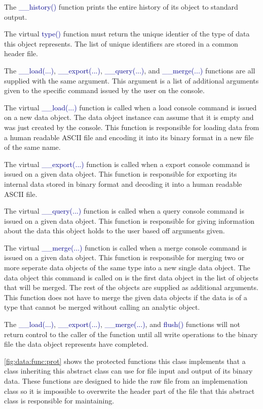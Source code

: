 \documentclass[10pt]{article}
\providecommand{\h}[1]{\textcolor{darkblue}{#1}}
\begin{document}
The \h{\_\_history()} function prints the entire history of its object to 
standard output.

The virtual \h{type()} function must return the unique identier of the type of 
data this object represents. The list of unique identifiers are stored in a 
common header file.

The \h{\_\_load(...)}, \h{\_\_export(...)}, \h{\_\_query(...)}, and 
\h{\_\_merge(...)} functions are all supplied with the same argument. This 
argument is a list of additional arguments given to the specific command issued 
by the user on the console.

The virtual \h{\_\_load(...)} function is called when a load console command 
is issued on a new data object. The data object instance can assume that it is 
empty and was just created by the console. This function is responsible for 
loading data from a human readable ASCII file and encoding it into its binary 
format in a new file of the same name.

The virtual \h{\_\_export(...)} function is called when a export console command 
is issued on a given data object. This function is responsible for exporting 
its internal data stored in binary format and decoding it into a human readable 
ASCII file.

The virtual \h{\_\_query(...)} function is called when a query console command 
is issued on a given data object. This function is responsible for giving 
information about the data this object holds to the user based off arguments 
given.

The virtual \h{\_\_merge(...)} function is called when a merge console command 
is issued on a given data object. This function is responsible for merging two 
or more seperate data objects of the same type into a new single data object. 
The data object this command is called on is the first data object in the list 
of objects that will be merged. The rest of the objects are supplied as 
additional arguments. This function does not have to merge the given data 
objects if the data is of a type that cannot be merged without calling an 
analytic object.

The \h{\_\_load(...)}, \h{\_\_export(...)}, \h{\_\_merge(...)}, and \h{flush()} 
functions will not return control to the caller of the function until all write 
operations to the binary file the data object represents have completed.

\autoref{fig:data:func:prot} shows the protected functions this class 
implements that a class inheriting this abstract class can use for file input 
and output of its binary data. These functions are designed to hide the raw 
file from an implemenation class so it is impossible to overwrite the header 
part of the file that this abstract class is responsible for maintaining.
\end{document}
